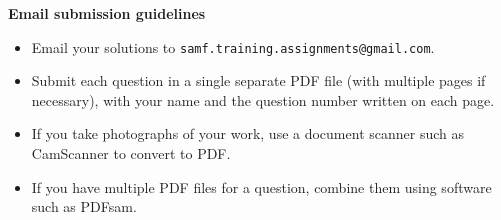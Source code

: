 \documentclass{article}
\begin{document}
\vfill
\textbf{\Large Email submission guidelines}
\begin{itemize}
	\item Email your solutions to \verb!samf.training.assignments@gmail.com!.
	\item Submit each question in a single separate PDF file (with multiple pages if necessary), with your name and the question number written on each page.
	\item If you take photographs of your work, use a document scanner such as CamScanner to convert to PDF.
	\item If you have multiple PDF files for a question, combine them using software such as PDFsam.
\end{itemize}
\end{document}

